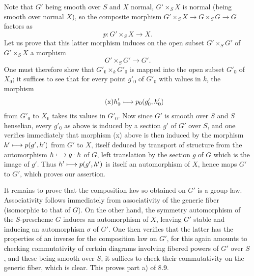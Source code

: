 Note that $G'$ being smooth over $S$ and $X$ normal, $G'\times_S X$ is normal (being smooth over normal $X$), so the composite morphism $G'\times_S X\to G\times_S G\to G$ factors as
\[
p:G'\times_S X\to X.
\]
Let us prove that this latter morphism induces on the open subset $G'\times_S G'$ of $G'\times_S X$ a morphism
\[
G'\times_S G'\to G'.
\]
One must therefore show that $G'_0\times_k G'_0$ is mapped into the open subset $G'_0$ of $X_0$; it suffices to see that for every point $g'_0$ of $G'_0$ with values in $k$, the morphism
\begin{equation}\tag{x}
h'_0\longmapsto p_0(g'_0,h'_0)
\end{equation}
from $G'_0$ to $X_0$ takes its values in $G'_0$. Now since $G'$ is smooth over $S$ and $S$ henselian, every $g'_0$ as above is induced by a section $g'$ of $G'$ over $S$, and one verifies immediately that morphism (x) above is then induced by the morphism $h'\longmapsto p(g',h')$ from $G'$ to $X$, itself deduced by transport of structure from the automorphism $h\longmapsto g\cdot h$ of $G$, left translation by the section $g$ of $G$ which is the image of $g'$. Thus $h'\longmapsto p(g',h')$ is itself an automorphism of $X$, hence maps $G'$ to $G'$, which proves our assertion.

It remains to prove that the composition law so obtained on $G'$ is a group law. Associativity follows immediately from associativity of the generic fiber (isomorphic to that of $G$). On the other hand, the symmetry automorphism of the $S$-prescheme $G$ induces an automorphism of $X$, leaving $G'$ stable and inducing an automorphism $\sigma$ of $G'$. One then verifies that the latter has the properties of an inverse for the composition law on $G'$, for this again amounts to checking commutativity of certain diagrams involving fibered powers of $G'$ over $S$, and these being smooth over $S$, it suffices to check their commutativity on the generic fiber, which is clear. This proves part a) of 8.9.

